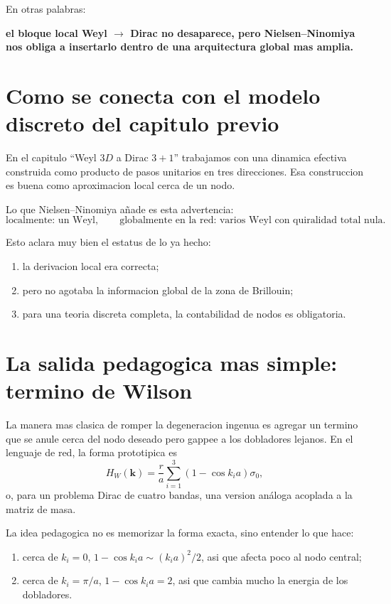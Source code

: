 En otras palabras:
\begin{displayquote}
\textbf{el bloque local Weyl \(\to\) Dirac no desaparece, pero Nielsen--Ninomiya nos obliga a insertarlo dentro de una arquitectura global mas amplia.}
\end{displayquote}

\section{Como se conecta con el modelo discreto del capitulo previo}
En el capitulo \enquote{Weyl \(3D\) a Dirac \(3+1\)} trabajamos con una dinamica efectiva construida como producto de pasos unitarios en tres direcciones. Esa construccion es buena como aproximacion local cerca de un nodo.

Lo que Nielsen--Ninomiya añade es esta advertencia:
\begin{equation}
\text{localmente: un Weyl},\qquad
\text{globalmente en la red: varios Weyl con quiralidad total nula}.
\end{equation}

Esto aclara muy bien el estatus de lo ya hecho:
\begin{enumerate}[label=\arabic*.]
    \item la derivacion local era correcta;
    \item pero no agotaba la informacion global de la zona de Brillouin;
    \item para una teoria discreta completa, la contabilidad de nodos es obligatoria.
\end{enumerate}

\section{La salida pedagogica mas simple: termino de Wilson}
La manera mas clasica de romper la degeneracion ingenua es agregar un termino que se anule cerca del nodo deseado pero gappee a los dobladores lejanos. En el lenguaje de red, la forma prototipica es
\begin{equation}
H_W(\bm{k}) =
\frac{r}{a}
\sum_{i=1}^3
\left(1-\cos k_i a\right)\sigma_0,
\end{equation}
o, para un problema Dirac de cuatro bandas, una version análoga acoplada a la matriz de masa.

La idea pedagogica no es memorizar la forma exacta, sino entender lo que hace:
\begin{enumerate}[label=\arabic*.]
    \item cerca de \(k_i=0\), \(1-\cos k_i a \sim (k_i a)^2/2\), asi que afecta poco al nodo central;
    \item cerca de \(k_i=\pi/a\), \(1-\cos k_i a = 2\), asi que cambia mucho la energia de los dobladores.
\end{enumerate}

